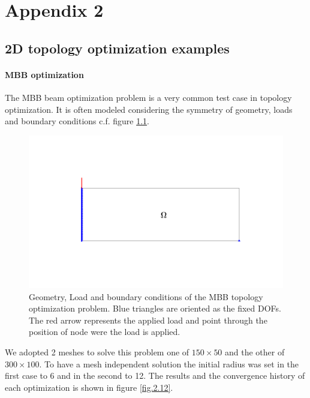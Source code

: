 \chapter{Appendix 2}
\section{2D topology optimization examples}
\label{examples_to2D}
\subsubsection{MBB optimization}
The MBB beam optimization problem is a very common test case in topology optimization. It is often modeled considering the symmetry of geometry, loads and boundary conditions c.f. figure \ref{fig.2.11}.
\begin{figure}[ht]
\centering
\includegraphics[width=\textwidth]{images/Ch2/design_problem}
\caption{Geometry, Load and boundary conditions of the MBB topology optimization problem. Blue triangles are oriented as the fixed DOFs. The red arrow represents the applied load and point through the position of node were the load is applied.}
\label{fig.2.11}
\end{figure}
We adopted 2 meshes to solve this problem one of $150\times50$ and the other of $300\times100$. To have a mesh independent solution the initial radius was set in the first case to 6 and in the second to 12. The results and the convergence history of each optimization is shown in figure \ref{fig.2.12}. 
